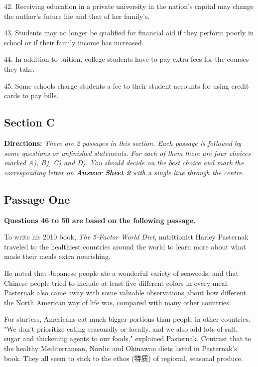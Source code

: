 \documentclass[UTF8,11pt]{ctexart}
\begin{document}
42. Receiving education in a private university in the nation's capital may change the author's future life and that of her family's.


43. Students may no longer be qualified for financial aid if they perform poorly in school or if their family income has increased.


44. In addition to tuition, college students have to pay extra fees for the courses they take.


45. Some schools charge students a fee to their student accounts for using credit cards to pay bills.


\subsection*{\textbf{Section C}}


\textbf{Directions: }\textit{There are 2 passages in this section. Each passage is followed by some questions or unfinished} \textit{statements. For each of them there are four choices marked A), B), C) and D). You should decide on the best} \textit{choice and mark the corresponding letter on }\textbf{\textit{Answer Sheet 2}}\textit{ with a single line through the centre.}


\subsection*{\textbf{Passage One}}


\textbf{Questions 46 to 50 are based on the following passage.}


To write his 2010 book, \textit{The 5-Factor World Diet}, nutritionist Harley Pasternak traveled to the healthiest countries around the world to learn more about what made their meals extra nourishing.


He noted that Japanese people ate a wonderful variety of seaweeds, and that Chinese people tried to include at least five different colors in every meal. Pasternak also came away with some valuable observations about how different the North American way of life was, compared with many other countries.


For starters, Americans eat much bigger portions than people in other countries. "We don't prioritize eating seasonally or locally, and we also add lots of salt, sugar and thickening agents to our foods," explained Pasternak. Contrast that to the healthy Mediterranean, Nordic and Okinawan diets listed in Pasternak's book. They all seem to stick to the ethos (特质) of regional, seasonal produce.
\end{document}
